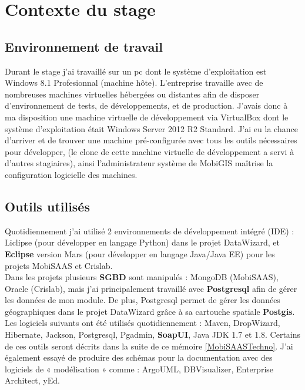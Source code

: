 \chapter{Contexte du stage}
\label{AnalyseConception}

\section{Environnement de travail}

Durant le stage j'ai travaillé sur un pc dont le système d'exploitation est Windows 8.1 Profesionnal (machine hôte). L'entreprise travaille avec de nombreuses machines virtuelles hébergées ou distantes afin de disposer d'environnement de tests, de développements, et de production. J'avais donc à ma disposition une machine virtuelle de développement via VirtualBox dont le système d'exploitation était Windows Server 2012 R2 Standard. 
J'ai eu la chance d'arriver et de \og trouver \fg une machine pré-configurée avec tous les outils nécessaires pour développer, (le clone de cette machine virtuelle de développement a servi à d'autres stagiaires), ainsi l'administrateur système de MobiGIS maîtrise la configuration logicielle des machines.\\

\section{Outils utilisés}

Quotidiennement j'ai utilisé 2 environnements de développement intégré (IDE) : Liclipse (pour développer en langage Python) dans le projet DataWizard, et \textbf{Eclipse} version Mars (pour développer en langage Java/Java EE) pour les projets MobiSAAS et Crislab.\\

Dans les projets plusieurs \textbf{SGBD} sont manipulés : MongoDB (MobiSAAS), Oracle (Crislab), mais j'ai principalement travaillé avec \textbf{Postgresql} afin de gérer les données de mon module. De plus, Postgresql permet de gérer les données géographiques dans le projet \og DataWizard \fg grâce à sa cartouche spatiale \textbf{Postgis}.\\

Les logiciels suivants ont été utilisés quotidiennement : Maven, DropWizard, Hibernate, Jackson, Postgresql, Pgadmin, \textbf{SoapUI}, Java JDK 1.7 et 1.8. Certains de ces outils seront décrits dans la suite de ce mémoire \ref{MobiSAASTechno}.
J'ai également essayé de produire des schémas pour la documentation avec des logiciels de « modélisation » comme : ArgoUML, DBVisualizer, Enterprise Architect, yEd.\\

